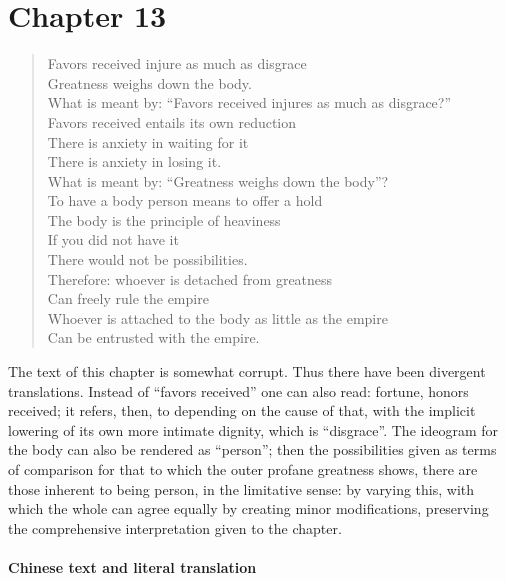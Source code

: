 \section{Chapter 13}

\begin{verse}
Favors received injure as much as disgrace\\
Greatness weighs down the body.\\
What is meant by: ``Favors received injures as much as disgrace?''\\
Favors received entails its own reduction\\
There is anxiety in waiting for it\\
There is anxiety in losing it.\\
What is meant by: ``Greatness weighs down the body''?\\
To have a body person means to offer a hold\\
The body is the principle of heaviness\\
If you did not have it\\
There would not be possibilities.\\
Therefore: whoever is detached from greatness\\
Can freely rule the empire\\
Whoever is attached to the body as little as the empire\\
Can be entrusted with the empire.
\end{verse}


The text of this chapter is somewhat corrupt. Thus there have been divergent translations. Instead of ``favors received'' one can also read: fortune, honors received; it refers, then, to depending on the cause of that, with the implicit lowering of its own more intimate dignity, which is ``disgrace''. The ideogram for the body can also be rendered as ``person''; then the possibilities given as terms of comparison for that to which the outer profane greatness shows, there are those inherent to being person, in the limitative sense: by varying this, with which the whole can agree equally by creating minor modifications, preserving the comprehensive interpretation given to the chapter.

\paragraph{Chinese text and literal translation}


